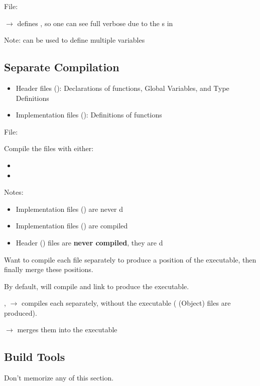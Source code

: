 File: 

 $ \rightarrow $ defines , so
one can see full verbose due to the s in 

Note:  can be used to define multiple variables

\subsection{Separate Compilation}
\begin{itemize}
    \item Header files (): Declarations of functions, Global Variables,
          and Type Definitions
    \item Implementation files (): Definitions of functions
\end{itemize}


File: 

Compile the files with either:
\begin{itemize}
    \item {}
    \item {}
\end{itemize}
Notes:
\begin{itemize}
    \item Implementation files () are never d
    \item Implementation files () are compiled
    \item Header () files are \textbf{never compiled}, they are d
\end{itemize}

Want to compile each file separately to produce a position of the executable,
then finally merge these positions.

By default,  will compile and link to produce the executable.

,  $ \rightarrow $ compiles each
separately, without the executable ( (Object) files are produced).

 $ \rightarrow $ merges them into
the  executable

\subsection{Build Tools}
Don't memorize any of this section.

